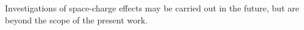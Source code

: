 
Investigations of space-charge effects may be carried out in the future, but are beyond the scope of the present work.



